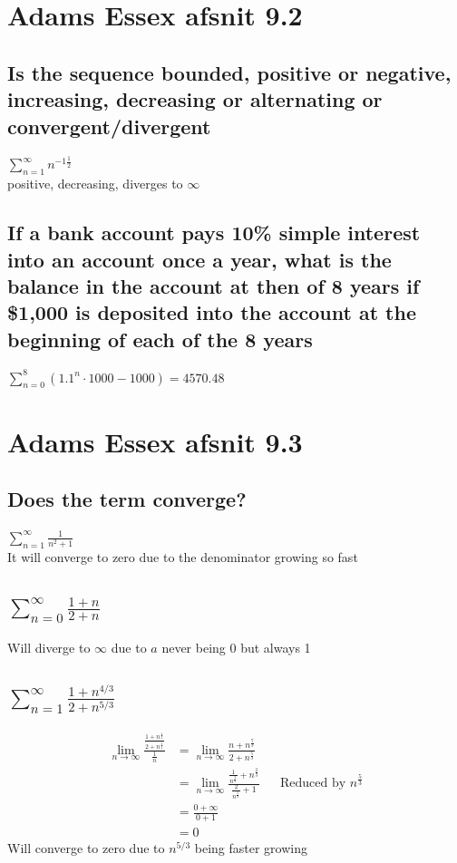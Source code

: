 \documentclass[12pt, a4paper]{report}
\begin{document}
		\section{Adams Essex afsnit 9.2}
			\setcounter{subsection}{16}
			\subsection{Is the sequence bounded, positive or negative, increasing, decreasing or alternating or convergent/divergent}
				$\sum\limits_{n=1}^{\infty}n^{-1\frac{1}{2}}$\\
				positive, decreasing, diverges to $\infty$
			\setcounter{subsection}{22}
			\subsection{If a bank account pays 10\% simple interest into an account once a year, what is the balance in the account at then of 8 years if \$1,000 is deposited into the account at the beginning of each of the 8 years}
				$\sum\limits_{n=0}^8(1.1^n\cdot 1000-1000)=4570.48$
		\section{Adams Essex afsnit 9.3}
			\subsection{Does the term converge?}
				$\sum\limits_{n=1}^{\infty}\frac{1}{n^2+1}$\\
				It will converge to zero due to the denominator growing so fast
			\setcounter{subsection}{9}
			\subsection{$\sum\limits_{n=0}^{\infty}\frac{1+n}{2+n}$}
				Will diverge to $\infty$ due to $a$ never being 0 but always 1
			\subsection{$\sum\limits_{n=1}^{\infty}\frac{1+n^{4/3}}{2+n^{5/3}}$}
				\begin{align*}
					\lim\limits_{n\rightarrow \infty}\frac{\frac{1+n^{\frac{4}{3}}}{2+n^{\frac{5}{3}}}}{\frac{1}{n}}&=\lim\limits_{n\rightarrow \infty}\frac{n+n^{\frac{7}{3}}}{2+n^{\frac{5}{3}}}				\\
																				&=\lim\limits_{n\rightarrow\infty}\frac{\frac{1}{n^{\frac{2}{3}}}+n^{\frac{2}{3}}}{\frac{2}{n^{\frac{5}{3}}}+1} &&\text{Reduced by } n^{\frac{5}{3}}\\
																				&=\frac{0+\infty}{0+1}\\
																				&=0					
				\end{align*}
				Will converge to zero due to $n^{5/3}$ being faster growing
			\setcounter{subsection}{16}
\end{document}
